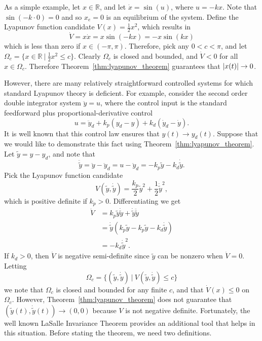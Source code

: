 As a simple example, let $x\in\mathbb{R}$, and let $\dot{x}=\sin(u)$, where $u=-kx$.  Note that $\sin(-k\cdot 0)=0$ and so $x_e=0$ is an equilibrium of the system.  Define the Lyapunov function candidate $V(x) = \frac{1}{2}x^2$, which results in 
\[
\dot{V} = x\dot{x} = x\sin(-kx) = -x\sin(kx)
\]
which is less than zero if $x\in (-\pi, \pi)$.  Therefore, pick any $0<c<\pi$, and let $\Omega_c = \{x\in\mathbb{R}  ~|~ \frac{1}{2}x^2 \leq c\}$.  Clearly $\Omega_c$ is closed and bounded, and $\dot{V}<0$ for all $x\in\Omega_c$.  Therefore Theorem~\ref{thm:lyapunov_theorem} guarantees that $\left|x(t)\right|\to 0$.

However, there are many relatively straightforward controlled systems for which standard Lyapunov theory is deficient.  For example, consider the second order double integrator system 
$\ddot{y}=u$,
where the control input is the standard feedforward plus proportional-derivative control
\[
u = \ddot{y}_d + k_p(y_d-y) + k_d(\dot{y}_d-\dot{y}).
\]
It is well known that this control law ensures that $y(t)\to y_d(t)$.  Suppose that we would like to demonstrate this fact using Theorem~\ref{thm:lyapunov_theorem}.  Let $\tilde{y} = y-y_d$, and note that
\begin{equation}\label{eq:double_integrator_lasalle}
\ddot{\tilde{y}} = \ddot{y}-\ddot{y}_d = u - \ddot{y}_d = -k_p\tilde{y} - k_d\dot{\tilde{y}}.
\end{equation}
Pick the Lyapunov function candidate
\[
V(\tilde{y},\dot{\tilde{y}}) = \frac{k_p}{2}\tilde{y}^2 + \frac{1}{2}\dot{\tilde{y}}^2,
\]
which is positive definite if $k_p>0$.  Differentiating we get
\begin{align*}
\dot{V} &= k_p \tilde{y}\dot{\tilde{y}} + \dot{\tilde{y}}\ddot{\tilde{y}} \\
 	&= \dot{\tilde{y}}\left( k_p	\tilde{y} - k_p\tilde{y} - k_d\dot{\tilde{y}} \right) \\
 	&= - k_d \dot{\tilde{y}}^2.
\end{align*}
If $k_d>0$, then $\dot{V}$ is negative semi-definite since $\tilde{y}$ can be nonzero when $\dot{V}=0$.  Letting 
\[
\Omega_c = \{ (\tilde{y}, \dot{\tilde{y}}) ~|~ V(\tilde{y},\dot{\tilde{y}}) \leq c \}
\]
we note that $\Omega_c$ is closed and bounded for any finite $c$, and that $\dot{V}(x)\leq 0$ on $\Omega_c$.  However, Theorem~\ref{thm:lyapunov_theorem} does not guarantee that $(\tilde{y}(t),\dot{\tilde{y}}(t))\to (0,0)$ because $V$ is not negative definite.  
%
Fortunately, the well known LaSalle Invariance Theorem provides an additional tool that helps in this situation. Before stating the theorem, we need two definitions.
